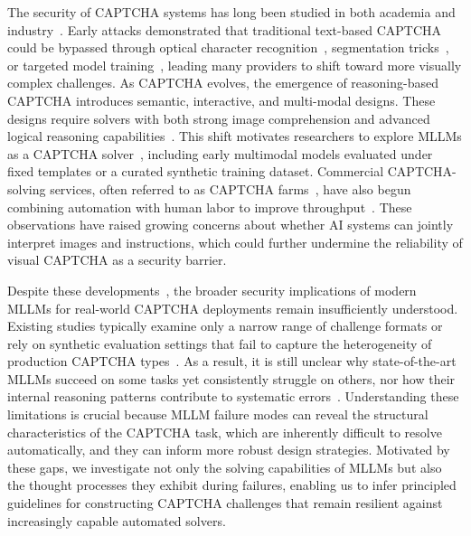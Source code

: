 \documentclass[sigconf, review]{acmart}
\begin{document}
The security of CAPTCHA systems has long been studied in both academia and industry~\cite{Sivakorn2016, laperdrix2020browser, 10646606}. Early attacks demonstrated that traditional text-based CAPTCHA could be bypassed through optical character recognition~\cite{nopecha_developers_2025}, segmentation tricks~\cite{theyka2025turnstilesolver}, or targeted model training~\cite{dessant2020buster}, leading many providers to shift toward more visually complex challenges. As CAPTCHA evolves, the emergence of reasoning-based CAPTCHA introduces semantic, interactive, and multi-modal designs. These designs require solvers with both strong image comprehension and advanced logical reasoning capabilities~\cite{ding2025illusioncaptcha}. This shift motivates researchers to explore MLLMs as a CAPTCHA solver~\cite{teoh2025captchas, deng2024oedipus}, including early multimodal models evaluated under fixed templates or a curated synthetic training dataset. Commercial CAPTCHA-solving services, often referred to as CAPTCHA farms~\cite{verifiedvisitors_captcha_farms}, have also begun combining automation with human labor to improve throughput~\cite{twocaptcha_service, captchacoder_service, decaptcher_service}. These observations have raised growing concerns about whether AI systems can jointly interpret images and instructions, which could further undermine the reliability of visual CAPTCHA as a security barrier.

Despite these developments~\cite{teoh2025captchas, deng2024oedipus, ding2025illusioncaptcha}, the broader security implications of modern MLLMs for real-world CAPTCHA deployments remain insufficiently understood. Existing studies typically examine only a narrow range of challenge formats or rely on synthetic evaluation settings that fail to capture the heterogeneity of production CAPTCHA types~\cite{zhang2020robust, Plesner_2024}. As a result, it is still unclear why state-of-the-art MLLMs succeed on some tasks yet consistently struggle on others, nor how their internal reasoning patterns contribute to systematic errors~\cite{captchaworld25}. Understanding these limitations is crucial because MLLM failure modes can reveal the structural characteristics of the CAPTCHA task, which are inherently difficult to resolve automatically, and they can inform more robust design strategies. Motivated by these gaps, we investigate not only the solving capabilities of MLLMs but also the thought processes they exhibit during failures, enabling us to infer principled guidelines for constructing CAPTCHA challenges that remain resilient against increasingly capable automated solvers.
\end{document}
